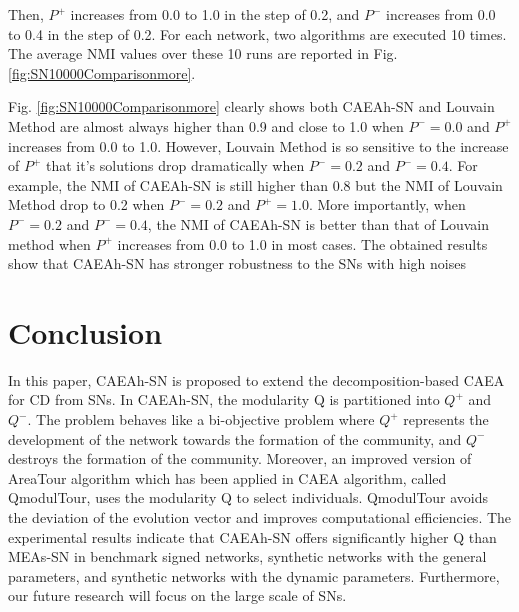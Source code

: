 \documentclass[10pt, journal]{IEEEtran}
\begin{document}
Then, $P^+$ increases from 0.0 to 1.0 in the step of 0.2, and $P^-$ increases from 0.0 to 0.4 in the step of 0.2. For each network, two algorithms are executed 10 times. The average NMI values over these 10 runs are reported in Fig. \ref{fig:SN10000Comparisonmore}.

Fig. \ref{fig:SN10000Comparisonmore} clearly shows both CAEAh-SN and Louvain Method are almost always higher than 0.9 and close to 1.0 when $P^-=0.0$ and $P^+$ increases from 0.0 to 1.0. However, Louvain Method is so sensitive to the increase of $P^+$ that it's solutions drop dramatically when $P^-=0.2$ and $P^-=0.4$. For example, the NMI of CAEAh-SN is still higher than 0.8 but the NMI of Louvain Method drop to 0.2 when $P^-=0.2$ and $P^+=1.0$. More importantly, when $P^-=0.2$ and $P^-=0.4$, the NMI of CAEAh-SN is better than that of Louvain method when $P^+$ increases from 0.0 to 1.0 in most cases. The obtained results show that CAEAh-SN has stronger robustness to the SNs with high noises


\section{Conclusion}\label{section:conclusion}
In this paper, CAEAh-SN is proposed to extend the decomposition-based CAEA for CD from SNs. In CAEAh-SN, the modularity Q is partitioned into $Q^+$ and $Q^-$. The problem behaves like a bi-objective problem where $Q^+$ represents the development of the network towards the formation of the community, and $Q^-$ destroys the formation of the community. Moreover, an improved version of AreaTour algorithm which has been applied in CAEA algorithm, called QmodulTour, uses the modularity Q to select individuals. QmodulTour avoids the deviation of the evolution vector and improves computational efficiencies. The experimental results indicate that CAEAh-SN offers significantly higher Q than MEAs-SN in benchmark signed networks, synthetic networks with the general parameters, and synthetic networks with the dynamic parameters. Furthermore, our future research will focus on the large scale of SNs.




\end{document}
